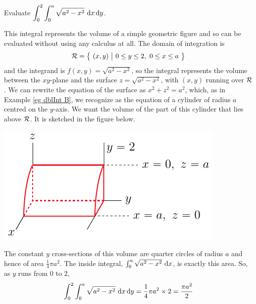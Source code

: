 \begin{eg}\label{eg dblInt C}
Evaluate $\displaystyle\int_0^2\int_0^a \sqrt{a^2-x^2}\ \dee{x}\,\dee{y}$.

\soln This integral represents the volume of a simple geometric figure
and so can be evaluated without using any calculus at all.
The domain of integration is
\begin{equation*}
\mathcal{R}=\big\{ \ (x,y)\ \big|\ 0\le y\le 2,\  0\le x\le a\ \big\}
\end{equation*}
and the integrand is $f(x,y) = \sqrt{a^2-x^2}$, so the integral 
represents the volume between the $xy$-plane and the surface 
$z=\sqrt{a^2-x^2}$, with $(x,y)$ running over $\mathcal{R}$. We can rewrite 
the equation of the surface as $x^2+z^2=a^2$, which, as in 
Example \ref{eg dblInt B}, we recognize as the 
equation of a cylinder of radius $a$ centred on the $y$-axis.
We want the volume of the part of this cylinder that lies above
$\mathcal{R}$. It is sketched in the figure below.
\begin{efig}
\begin{center}
   \includegraphics{qCylinder.pdf}\qquad\qquad
\end{center}
\end{efig}
The constant $y$ cross-sections of this volume are quarter
circles of radius $a$ and hence of area $\frac{1}{4}\pi a^2$. 
The inside integral, $\int_0^a \sqrt{a^2-x^2}\ \dee{x}$, is exactly this area.
So, as $y$ runs from $0$ to $2$,
\begin{equation*}
\int_0^2\int_0^a \sqrt{a^2-x^2}\ \dee{x}\,\dee{y}
=\frac{1}{4}\pi a^2\times 2
=\frac{\pi a^2}{2} 
\end{equation*}
\end{eg}

